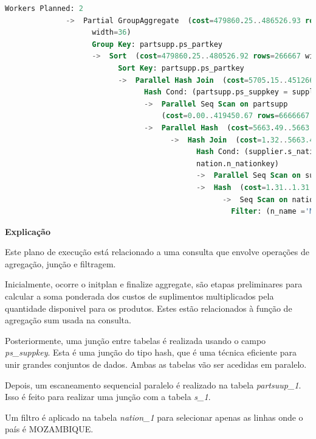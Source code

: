 \documentclass{article}
\begin{document}
\begin{lstlisting}[language=SQL]
              Workers Planned: 2
              ->  Partial GroupAggregate  (cost=479860.25..486526.93 rows=266667 
                    width=36)
                    Group Key: partsupp.ps_partkey
                    ->  Sort  (cost=479860.25..480526.92 rows=266667 width=14)
                          Sort Key: partsupp.ps_partkey
                          ->  Parallel Hash Join  (cost=5705.15..451266.82 rows=266667 width=14)
                                Hash Cond: (partsupp.ps_suppkey = supplier.s_suppkey)
                                ->  Parallel Seq Scan on partsupp  
                                    (cost=0.00..419450.67 rows=6666667 width=18)
                                ->  Parallel Hash  (cost=5663.49..5663.49 rows=3333 width=4)
                                      ->  Hash Join  (cost=1.32..5663.49 rows=3333 width=4)
                                            Hash Cond: (supplier.s_nationkey = 
                                            nation.n_nationkey)
                                            ->  Parallel Seq Scan on supplier  (cost=0.00..5316.33 rows=83333 width=8)
                                            ->  Hash  (cost=1.31..1.31 rows=1 width=4)
                                                  ->  Seq Scan on nation  (cost=0.00..1.31 rows=1 width=4)
                                                    Filter: (n_name ='MOZAMBIQUE'::bpchar)

\end{lstlisting}

\textbf{Explicação}\\
\texttt{}\par Este plano de execução está relacionado a uma consulta que envolve operações de agregação, junção e filtragem.

Inicialmente, ocorre o initplan e finalize aggregate, são etapas preliminares para calcular a soma ponderada dos custos de suplimentos multiplicados pela quantidade disponivel para os produtos. Estes estão relacionados à função de agregação sum usada na consulta.

Posteriormente, uma junção entre tabelas é realizada usando o campo \textit{ps\_suppkey}. Esta é uma junção do tipo hash, que é uma técnica eficiente para unir grandes conjuntos de dados. Ambas as tabelas vão ser acedidas em paralelo. 

Depois, um escaneamento sequencial paralelo é realizado na tabela \textit{partsuup\_1}. Isso é feito para realizar uma junção com a tabela \textit{s\_1}.

Um filtro é aplicado na tabela \textit{nation\_1} para selecionar apenas as linhas onde o país é MOZAMBIQUE.
\end{document}
